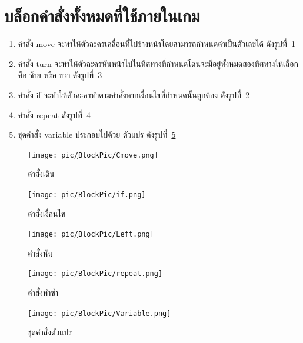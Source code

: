 \section{บล็อกคำสั่งทั้งหมดที่ใช้ภายในเกม}
\begin{enumerate}
    \item คำสั่ง move จะทำให้ตัวละครเคลื่อนที่ไปข้างหน้าโดยสามารถกำหนดค่าเป็นตัวเลขได้
    ดังรูปที่~\ref{moveB}
    \item คำสั่ง turn จะทำให้ตัวละครหันหน้าไปในทิศทางที่กำหนดโดนจะมีอยู่ทั้งหมดสองทิศทางให้เลือกคือ ซ้าย หรือ ขวา
    ดังรูปที่~\ref{turnB}
    \item คำสั่ง if จะทำให้ตัวละครทำตามคำสั่งหากเงื่อนไขที่กำหนดนั้นถูกต้อง
    ดังรูปที่~\ref{ifB}
    \item คำสั่ง repeat
    ดังรูปที่~\ref{repeatB}
    \item ชุดคำสั่ง variable ประกอบไปด้วย ตัวแปร 
    ดังรูปที่~\ref{variableB}
\end{enumerate}
\begin{figure}[H]
    \begin{center}
        \texttt{[image: pic/ฺBlockPic/Cmove.png]}
    \end{center}
    \caption[คำสั่งเดิน]{คำสั่งเดิน}
    \label{moveB}
\end{figure}
\begin{figure}[H]
    \begin{center}
        \texttt{[image: pic/ฺBlockPic/if.png]}
    \end{center}
    \caption[คำสั่งมีเงื่อนไข]{คำสั่งเงื่อนไข}
    \label{ifB}
\end{figure}
\begin{figure}[H]
    \begin{center}
        \texttt{[image: pic/ฺBlockPic/Left.png]}
    \end{center}
    \caption[คำสั่งหัน]{คำสั่งหัน}
    \label{turnB}
\end{figure}
\begin{figure}[H]
    \begin{center}
        \texttt{[image: pic/ฺBlockPic/repeat.png]}
    \end{center}
    \caption[คำสั่งทังซ้ำ]{คำสั่งทำซ้ำ}
    \label{repeatB}
\end{figure}
\begin{figure}[H]
    \begin{center}
        \texttt{[image: pic/ฺBlockPic/Variable.png]}
    \end{center}
    \caption[ชุดคำสั่งตัวแปร]{ชุดคำสั่งตัวแปร}
    \label{variableB}
\end{figure}

